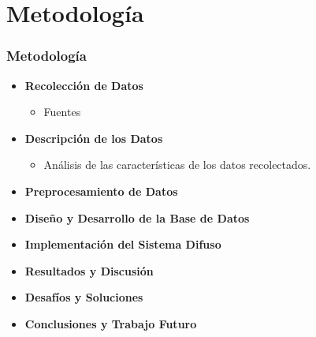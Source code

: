 \documentclass{beamer}
\begin{document}
\section{Metodología}
\begin{frame}
\frametitle{Metodología}
\begin{itemize}
    \item \textbf{Recolección de Datos}
    \begin{itemize}
        \item Fuentes
    \end{itemize}
    \item \textbf{Descripción de los Datos}
    \begin{itemize}
        \item Análisis de las características de los datos recolectados.
    \end{itemize}
    \item \textbf{Preprocesamiento de Datos}
    \item \textbf{Diseño y Desarrollo de la Base de Datos}
    \item \textbf{Implementación del Sistema Difuso}
    \item \textbf{Resultados y Discusión}
    \item \textbf{Desafíos y Soluciones}
    \item \textbf{Conclusiones y Trabajo Futuro}

\end{itemize}
\end{frame}
\end{document}
